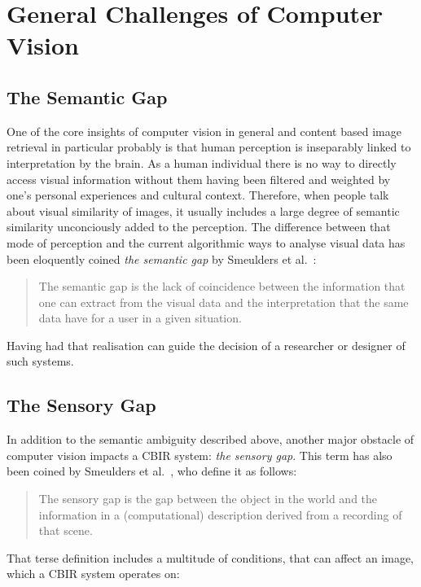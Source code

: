 \section{General Challenges of Computer Vision}

\subsection{The Semantic Gap}

One of the core insights of computer vision in general and content based image
retrieval in particular probably is that human perception is inseparably linked
to interpretation by the brain. As a human individual there is no way to
directly access visual information without them having been filtered and
weighted by one's personal experiences and cultural context. Therefore, when
people talk about visual similarity of images, it usually includes a large
degree of semantic similarity unconciously added to the perception. The
difference between that mode of perception and the current algorithmic ways to
analyse visual data has been eloquently coined \emph{the semantic gap} by
Smeulders et al.\ \autocite{smeulders_content-based_2000}:

\begin{quote}
The semantic gap is the lack of coincidence between the information that one
can extract from the visual data and the interpretation that the same data have
for a user in a given situation.
\end{quote}

Having had that realisation can guide the decision of a researcher or designer
of such systems.

\subsection{The Sensory Gap}

In addition to the semantic ambiguity described above, another major obstacle
of computer vision impacts a CBIR system: \emph{the sensory gap}. This term has
also been coined by Smeulders et al.\ \autocite{smeulders_content-based_2000},
who define it as follows:

\begin{quote}
The sensory gap is the gap between the object in the world and the information
in a (computational) description derived from a recording of that scene.
\end{quote}

That terse definition includes a multitude of conditions, that can affect an
image, which a CBIR system operates on:

